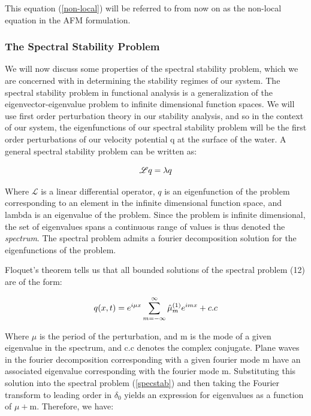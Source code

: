 \documentclass{article}
\begin{document}
\vspace{10}

This equation (\ref{non-local}) will be referred to from now on as the non-local equation in the AFM formulation.
\vspace{5}

\subsubsection{The Spectral Stability Problem}

We will now discuss some properties of the spectral stability problem, which we are concerned with in determining the stability regimes of our system. The spectral stability problem in functional analysis is a generalization of the eigenvector-eigenvalue problem to infinite dimensional function spaces. We will use first order perturbation theory in our stability analysis, and so in the context of our system, the eigenfunctions of our spectral stability problem will be the first order perturbations of our velocity potential q at the surface of the water. A general spectral stability problem can be written as: 


 \begin{equation} \label{specstab}
  \mathscr{L}q = \lambda q
   \\
\end{equation}

Where \(\mathscr{L}\) is a linear differential operator, \(q\) is an eigenfunction of the problem corresponding to an element in the infinite dimensional function space, and lambda is an eigenvalue of the problem. Since the problem is infinite dimensional, the set of eigenvalues spans a continuous range of values is thus denoted the \emph{spectrum}. The spectral problem admits a fourier decomposition solution for the eigenfunctions of the problem. 

\vspace{15} 

Floquet's theorem tells us that all bounded solutions of the spectral problem (12) are of the form: 

 \begin{equation} \label{floquet}
  q(x,t) = e^{i\mu x} \sum_{m=-\infty}^{\infty} \hat\mu^{(1)}_m e^{imx} + c.c
   \\
\end{equation}

Where \(\mu\) is the period of the perturbation, and m is the mode of a given eigenvalue in the spectrum, and c.c denotes the complex conjugate. Plane waves in the fourier decomposition corresponding with a given fourier mode m have an associated eigenvalue corresponding with the fourier mode m.  Substituting this solution into the spectral problem (\ref{specstab}) and then taking the Fourier transform to leading order in \(\delta_0\) yields an expression for eigenvalues as a function of \(\mu +\)m. Therefore, we have:
\end{document}
